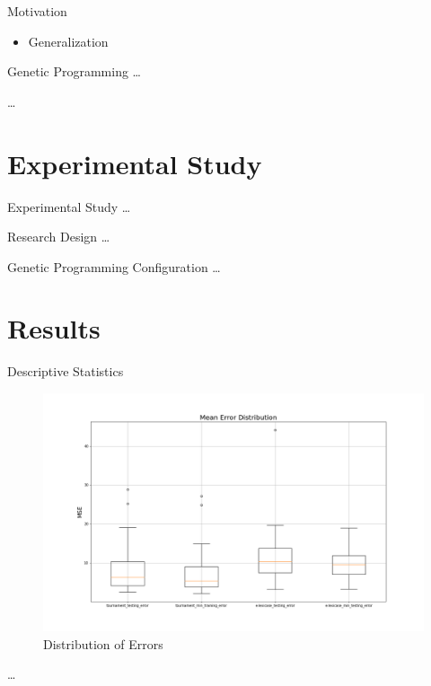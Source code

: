 \documentclass[
  ignorenonframetext,
]{beamer}
\providecommand{\tightlist}{%
  \setlength{\itemsep}{0pt}\setlength{\parskip}{0pt}}
\begin{document}
\begin{frame}{Motivation}
\protect\hypertarget{motivation}{}
\begin{itemize}
\tightlist
\item
  Generalization
\end{itemize}
\end{frame}

\begin{frame}{Genetic Programming}
\protect\hypertarget{genetic-programming-1}{}
\ldots{}

\ldots{}
\end{frame}

\hypertarget{experimental-study}{%
\section{Experimental Study}\label{experimental-study}}

\begin{frame}{Experimental Study}
\ldots{}
\end{frame}

\begin{frame}{Research Design}
\protect\hypertarget{research-design}{}
\ldots{}
\end{frame}

\begin{frame}{Genetic Programming Configuration}
\protect\hypertarget{genetic-programming-configuration}{}
\ldots{}
\end{frame}

\hypertarget{results}{%
\section{Results}\label{results}}

\begin{frame}{Descriptive Statistics}
\protect\hypertarget{descriptive-statistics}{}
\begin{figure}
\centering
\includegraphics{../plots/mean_error_boxplot_all.png}
\caption{Distribution of Errors}
\end{figure}

\ldots{}
\end{frame}
\end{document}
